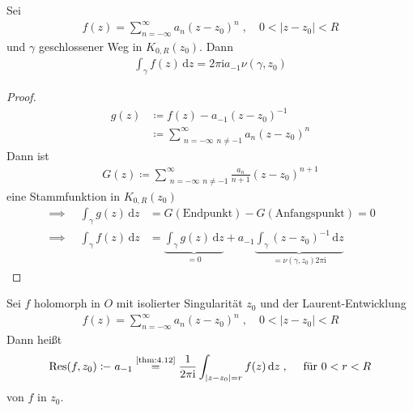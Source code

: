\documentclass[a4paper,10pt]{scrbook}
\begin{document}
\begin{theorem}[Satz] \label{thm:4.12}
  Sei
  \begin{align*}
    f(z) = \sum\limits_{n = -\infty}^{\infty} a_n (z-z_0)^n \; , \quad 0 < |z-z_0| < R
  \end{align*}
  und $\gamma$ geschlossener Weg in $K_{0,R}(z_0)$. Dann
  \begin{align*}
    \int_{\gamma} f(z) \, \mathrm{d}z = 2 \pi \mathrm{i} a_{-1} \nu(\gamma,z_0)
  \end{align*}

  \begin{proof}
    \begin{align*}
      g(z)
      &\coloneq f(z) - a_{-1} (z-z_0)^{-1} \\
      &\coloneq \sum\limits_{\substack{n=-\infty}{n \neq -1}}^{\infty} a_n (z-z_0)^n
    \end{align*}
    Dann ist
    \begin{align*}
      G(z) \coloneq \sum\limits_{\substack{n=-\infty}{n \neq -1}}^{\infty} \frac{a_n}{n+1} (z-z_0)^{n+1}
    \end{align*}
    eine Stammfunktion in $K_{0,R}(z_0)$
    \begin{align*}
      \implies \quad \int_\gamma g(z) \, \mathrm{d}z &= G(\text{Endpunkt}) - G(\text{Anfangspunkt}) = 0 \\
      \implies \quad \int_\gamma f(z) \, \mathrm{d}z &= \underbrace{\int_\gamma g(z) \, \mathrm{d}z}_{=0} + a_{-1} \underbrace{\int_\gamma (z-z_0)^{-1} \, \mathrm{d}z}_{= \nu(\gamma,z_0) 2 \pi \mathrm{i}}
    \end{align*}
  \end{proof}
\end{theorem}

\begin{theorem}[Definition]
  Sei $f$ holomorph in $O$ mit isolierter Singularität $z_0$ und der Laurent-Entwicklung
  \begin{align*}
    f(z) = \sum\limits_{n = -\infty}^{\infty} a_n (z-z_0)^n \; , \quad 0 < |z-z_0| < R
  \end{align*}
  Dann heißt
  \begin{align*}
    \mathrm{Res}(f,z_0) \coloneq a_{-1} \overset{\text{\ref{thm:4.12}}}{=} \frac{1}{2 \pi \mathrm{i}} \int_{|z-z_0|=r} f(z) \, \mathrm{d}z \; , \quad \text{ für } 0 < r < R
  \end{align*}
   von $f$ in $z_0$.
\end{theorem}
\end{document}
